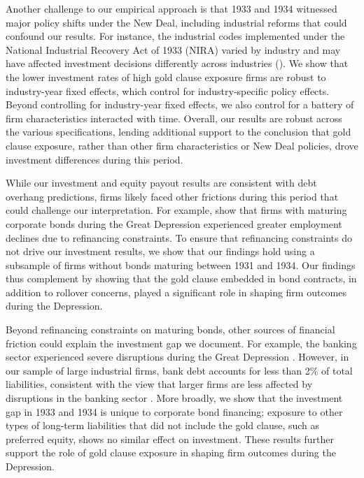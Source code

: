 Another challenge to our empirical approach is that 1933 and 1934 witnessed major policy shifts under the New Deal, including industrial reforms that could confound our results. For instance, the industrial codes implemented under the National Industrial Recovery Act of 1933 (NIRA) varied by industry and may have affected investment decisions differently across industries (\cite{Cole2004}). We show that the lower investment rates of high gold clause exposure firms are robust to industry-year fixed effects, which control for industry-specific policy effects. Beyond controlling for industry-year fixed effects, we also control for a battery of firm characteristics interacted with time. Overall, our results are robust across the various specifications, lending additional support to the conclusion that gold clause exposure, rather than other firm characteristics or New Deal policies, drove investment differences during this period.

While our investment and equity payout results are consistent with debt overhang predictions, firms likely faced other frictions during this period that could challenge our interpretation. For example, \cite{Benmelech2018} show that firms with maturing corporate bonds during the Great Depression experienced greater employment declines due to refinancing constraints. To ensure that refinancing constraints do not drive our investment results, we show that our findings hold using a subsample of firms without bonds maturing between 1931 and 1934. Our findings thus complement \cite{Benmelech2018} by showing that the gold clause embedded in bond contracts, in addition to rollover concerns, played a significant role in shaping firm outcomes during the Depression.

Beyond refinancing constraints on maturing bonds, other sources of financial friction could explain the investment gap we document. For example, the banking sector experienced severe disruptions during the Great Depression \citep{Bernanke1983}. However, in our sample of large industrial firms, bank debt accounts for less than 2\% of total liabilities, consistent with the view that larger firms are less affected by disruptions in the banking sector \citep{Bernanke2018, Siemer2014}. More broadly, we show that the investment gap in 1933 and 1934 is unique to corporate bond financing; exposure to other types of long-term liabilities that did not include the gold clause, such as preferred equity, shows no similar effect on investment. These results further support the role of gold clause exposure in shaping firm outcomes during the Depression.

